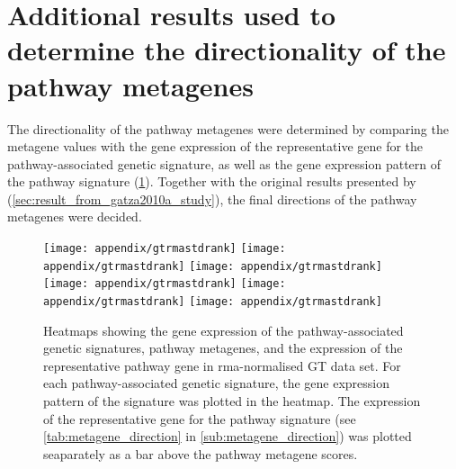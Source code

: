 	\newpage


	\section{Additional results used to determine the directionality of the pathway metagenes}
	\label{sec:additional_results_to_determine_the_directionality_of_the_pathway_metagenes}

	The directionality of the pathway metagenes were determined by comparing the metagene values with the gene expression of the representative gene for the pathway-associated genetic signature, as well as the gene expression pattern of the pathway signature (\cref{fig:appendix/gt_pathmeta_rank}).
	Together with the original results presented by \citet{Gatza2010a} (\cref{sec:result_from_gatza2010a_study}), the final directions of the pathway metagenes were decided.

	\begin{figure}[htp!]
		\centering
		\texttt{[image: appendix/gtrmastdrank]}
		\texttt{[image: appendix/gtrmastdrank]}
		\texttt{[image: appendix/gtrmastdrank]}\\
		\texttt{[image: appendix/gtrmastdrank]}
		\texttt{[image: appendix/gtrmastdrank]}
		\texttt{[image: appendix/gtrmastdrank]}\\
		\caption[Directionality of the pathway metagenes in the GT data]{Heatmaps showing the gene expression of the pathway-associated genetic signatures, pathway metagenes, and the expression of the representative pathway gene in \gls{rma}-normalised GT data set.
		For each pathway-associated genetic signature, the gene expression pattern of the signature was plotted in the heatmap.
		The expression of the representative gene for the pathway signature (see \cref{tab:metagene_direction} in \cref{sub:metagene_direction}) was plotted seaparately as a bar above the pathway metagene scores.
		}
		\label{fig:appendix/gt_pathmeta_rank}
	\end{figure}

